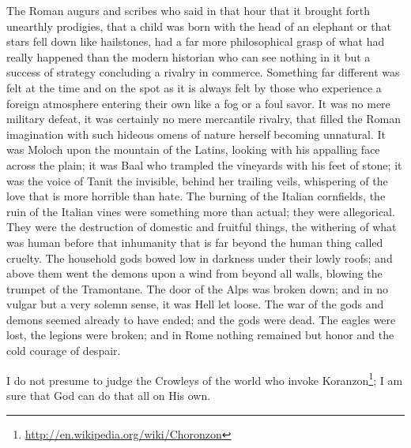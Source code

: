 \begin{quotex}
The Roman augurs and scribes who said in that hour that it brought forth unearthly prodigies, that a child was born with the head of an elephant or that stars fell down like hailstones, had a far more philosophical grasp of what had really happened than the modern historian who can see nothing in it but a success of strategy concluding a rivalry in commerce. Something far different was felt at the time and on the spot as it is always felt by those who experience a foreign atmosphere entering their own like a fog or a foul savor. It was no mere military defeat, it was certainly no mere mercantile rivalry, that filled the Roman imagination with such hideous omens of nature herself becoming unnatural. It was Moloch upon the mountain of the Latins, looking with his appalling face across the plain; it was Baal who trampled the vineyards with his feet of stone; it was the voice of Tanit the invisible, behind her trailing veils, whispering of the love that is more horrible than hate. The burning of the Italian cornfields, the ruin of the Italian vines were something more than actual; they were allegorical. They were the destruction of domestic and fruitful things, the withering of what was human before that inhumanity that is far beyond the human thing called cruelty. The household gods bowed low in darkness under their lowly roofs; and above them went the demons upon a wind from beyond all walls, blowing the trumpet of the Tramontane. The door of the Alps was broken down; and in no vulgar but a very solemn sense, it was Hell let loose. The war of the gods and demons seemed already to have ended; and the gods were dead. The eagles were lost, the legions were broken; and in Rome nothing remained but honor and the cold courage of despair.
\end{quotex}


I do not presume to judge the Crowleys of the world who invoke Koranzon\footnote{\url{http://en.wikipedia.org/wiki/Choronzon}}; I am sure that God can do that all on His own.

